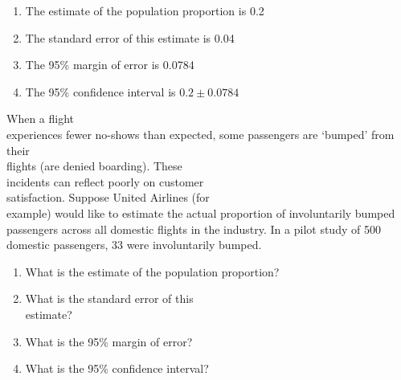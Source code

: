 \documentclass[11pt]{book}\usepackage[]{graphicx}\usepackage[]{color}
\begin{document}
\begin{exercises}
\begin{exercise}
  \end{exercise}
  \begin{solution} %

\begin{enumerate}
\item The estimate of the population proportion is 0.2
\item The standard error of this estimate is 0.04
\item The 95\% margin of error is 0.0784
\item The 95\% confidence interval is $0.2 \pm 0.0784$
\end{enumerate}

  \end{solution}

  \begin{exercise} %

When a flight \\ experiences fewer no-shows than expected, some passengers are `bumped' from their \\ flights (are denied boarding).  These \\ incidents can reflect poorly on customer \\ satisfaction.  Suppose  United Airlines (for \\ example) would like to estimate the actual proportion of involuntarily bumped passengers across all domestic  flights in the industry.  In a pilot study of 500 domestic passengers, 33 were involuntarily   bumped.

\begin{enumerate}
\item	What is the estimate of the population proportion?
\item	What is the standard error of this \\ estimate?
\item	What is the 95\% margin of error?
\item	What is the 95\% confidence interval?
\end{enumerate}
  \end{exercise}
%


\end{exercises}
\end{document}
